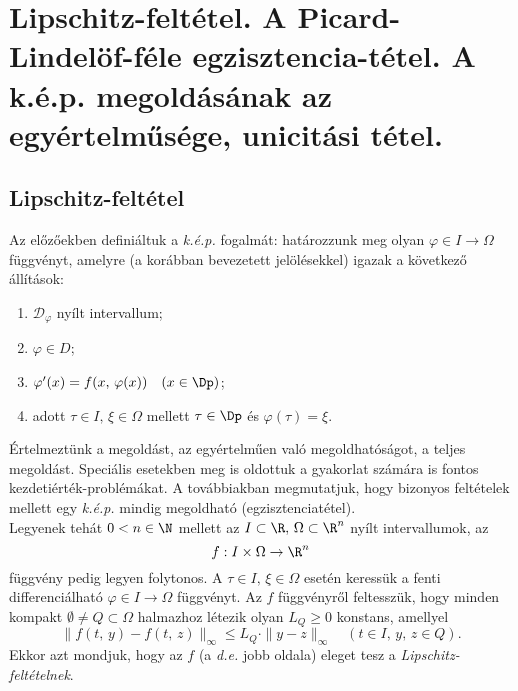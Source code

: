 \newpage
\section{Lipschitz-feltétel. A Picard-Lindelöf-féle egzisztencia-tétel. A k.é.p. megoldásának az egyértelműsége, unicitási tétel.}
\subsection{Lipschitz-feltétel}
Az előzőekben definiáltuk a \textit{k.é.p.} fogalmát: határozzunk meg olyan $\varphi \in I \to \Omega$ függvényt, amelyre (a korábban bevezetett jelölésekkel) igazak a következő állítások:
\begin{enumerate}
	\item $\mathcal{D}_\varphi$ nyílt intervallum;
	\item $\varphi \in D$;
	\item $\varphi'(x) = f(x, \, \varphi(x)) \quad (x \in \Dp)$;
	\item adott $\tau \in I, \, \xi \in \Omega$ mellett $\tau \in \Dp$ és $\varphi(\tau) = \xi$.
\end{enumerate}
Értelmeztünk a megoldást, az egyértelműen való megoldhatóságot, a teljes megoldást. Speciális esetekben meg is oldottuk a gyakorlat számára is fontos kezdetiérték-problémákat. A továbbiakban megmutatjuk, hogy bizonyos feltételek mellett egy \textit{k.é.p.} mindig megoldható (egzisztenciatétel).\\

Legyenek tehát $0 < n \in \N$ mellett az $I \subset \R, \, \Omega \subset \R^n$ nyílt intervallumok, az
\[
f : I \times \Omega \to \R^n
\]
függvény pedig legyen folytonos. A $\tau \in I, \, \xi \in \Omega$ esetén keressük a fenti differenciálható $\varphi \in I \to \Omega$ függvényt. Az $f$ függvényről feltesszük, hogy minden kompakt $\emptyset \neq Q \subset \Omega$ halmazhoz létezik olyan $L_Q \geq 0$ konstans, amellyel
\[
\| f(t, \, y) - f(t, \, z) \|_\infty \leq L_Q \cdot \| y - z \|_\infty \quad (t \in I, \, y, \, z \in Q).
\]
Ekkor azt mondjuk, hogy az $f$ (a \textit{d.e.} jobb oldala) eleget tesz a \textit{Lipschitz-feltételnek}.

